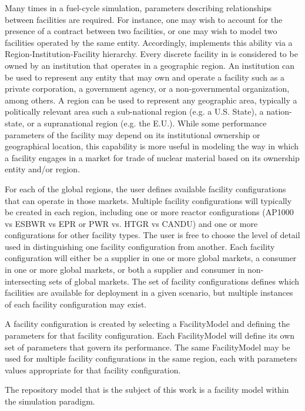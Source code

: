 Many times in a fuel-cycle simulation, parameters describing
relationships between facilities are required. For instance, one may
wish to account for the presence of a contract between two facilities,
or one may wish to model two facilities operated by the same
entity. Accordingly, \Cyclus implements this ability via a
Region-Institution-Facility hierarchy. Every discrete facility in
\Cyclus is considered to be owned by an institution that operates in a
geographic region.  An institution can be used to represent any entity
that may own and operate a facility such as a private corporation, a
government agency, or a non-governmental organization, among others.
A region can be used to represent any geographic area, typically a
politically relevant area such a sub-national region (e.g. a
U.S. State), a nation-state, or a supranational
region (e.g. the E.U.).  While some performance parameters of the
facility may depend on its institutional ownership or geographical
location, this capability is more useful in modeling the way in which
a facility engages in a market for trade of nuclear material based on
its ownership entity and/or region.

For each of the global regions, the user defines available facility 
configurations that can operate in those markets.  Multiple facility 
configurations will typically be created in each region, including one 
or more reactor configurations (AP1000 vs ESBWR vs EPR or PWR vs.  
HTGR vs CANDU) and one or more configurations for other facility 
types.  The user is free to choose the level of detail used in 
distinguishing one facility configuration from another.  Each facility 
configuration will either be a supplier in one or more global markets, 
a consumer in one or more global markets, or both a supplier and 
consumer in non-intersecting sets of global markets.  The set of 
facility configurations defines which facilities are available for 
deployment in a given scenario, but multiple instances of each 
facility configuration may exist.

A facility configuration is created by selecting a FacilityModel and 
defining the parameters for that facility configuration.
Each FacilityModel will define its own set of parameters that 
govern its performance.  The same FacilityModel may be used for 
multiple facility configurations in the same region, each with 
parameters values appropriate for that facility configuration.

The repository model that is the subject of this work is a facility 
model within the \Cyclus simulation paradigm. 


